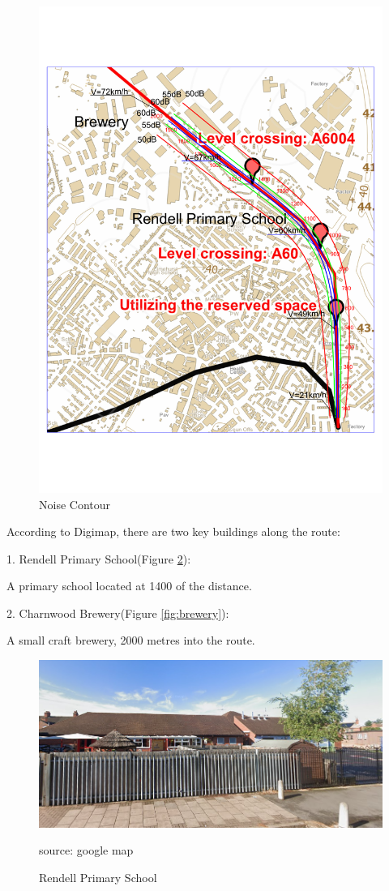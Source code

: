 \documentclass[letterpaper,12pt,leqno]{article}
\begin{document}
	\begin{figure}[H]
		\centering
		\includegraphics[width=0.7\linewidth]{noise_contour}
		\caption{Noise Contour}
		\label{fig:noisecontour}
	\end{figure}

	
	
	
	According to Digimap, there are two key buildings along the route:
	
	1. Rendell Primary School(Figure \ref{fig:primaryschool}):
	
	A primary school located at 1400 of the distance.
	
	2. Charnwood Brewery(Figure \ref{fig:brewery}):
	
	A small craft brewery, 2000 metres into the route.
	
	
	\begin{figure}[H]
		\centering
		\includegraphics[width=0.7\linewidth]{primaryschool}
		\caption{Rendell Primary School}
		\small{source: google map}
		\label{fig:primaryschool}
	\end{figure}
	
\end{document}
